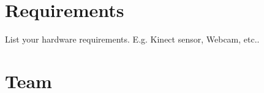 \documentclass[a4paper,pagesize 10pt]{scrartcl}
\begin{document}
\section{Requirements}
List your hardware requirements. E.g. Kinect sensor, Webcam, etc..

\section{Team}



{\small
	
	
}
\end{document}
